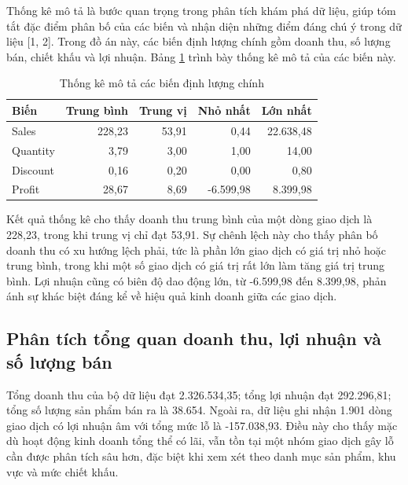 Thống kê mô tả là bước quan trọng trong phân tích khám phá dữ liệu, giúp tóm tắt đặc điểm phân bố của các biến và nhận diện những điểm đáng chú ý trong dữ liệu [1, 2]. Trong đồ án này, các biến định lượng chính gồm doanh thu, số lượng bán, chiết khấu và lợi nhuận. Bảng \ref{tab:thong-ke-mo-ta} trình bày thống kê mô tả của các biến này.

\begin{table}[H]
\centering
\caption{Thống kê mô tả các biến định lượng chính}
\label{tab:thong-ke-mo-ta}
\begin{tabular}{|l|r|r|r|r|}
\hline
\textbf{Biến} & \textbf{Trung bình} & \textbf{Trung vị} & \textbf{Nhỏ nhất} & \textbf{Lớn nhất} \\
\hline
Sales & 228,23 & 53,91 & 0,44 & 22.638,48 \\
\hline
Quantity & 3,79 & 3,00 & 1,00 & 14,00 \\
\hline
Discount & 0,16 & 0,20 & 0,00 & 0,80 \\
\hline
Profit & 28,67 & 8,69 & -6.599,98 & 8.399,98 \\
\hline
\end{tabular}
\end{table}

Kết quả thống kê cho thấy doanh thu trung bình của một dòng giao dịch là 228,23, trong khi trung vị chỉ đạt 53,91. Sự chênh lệch này cho thấy phân bố doanh thu có xu hướng lệch phải, tức là phần lớn giao dịch có giá trị nhỏ hoặc trung bình, trong khi một số giao dịch có giá trị rất lớn làm tăng giá trị trung bình. Lợi nhuận cũng có biên độ dao động lớn, từ -6.599,98 đến 8.399,98, phản ánh sự khác biệt đáng kể về hiệu quả kinh doanh giữa các giao dịch.

\subsection*{\thesubsection\quad Phân tích tổng quan doanh thu, lợi nhuận và số lượng bán}

Tổng doanh thu của bộ dữ liệu đạt 2.326.534,35; tổng lợi nhuận đạt 292.296,81; tổng số lượng sản phẩm bán ra là 38.654. Ngoài ra, dữ liệu ghi nhận 1.901 dòng giao dịch có lợi nhuận âm với tổng mức lỗ là -157.038,93. Điều này cho thấy mặc dù hoạt động kinh doanh tổng thể có lãi, vẫn tồn tại một nhóm giao dịch gây lỗ cần được phân tích sâu hơn, đặc biệt khi xem xét theo danh mục sản phẩm, khu vực và mức chiết khấu.

